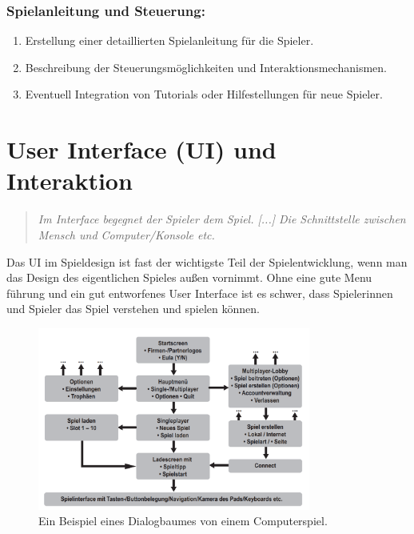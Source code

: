 \subsection{Spielanleitung und Steuerung:}
\begin{enumerate}
  \item Erstellung einer detaillierten Spielanleitung für die Spieler.
  \item Beschreibung der Steuerungsmöglichkeiten und Interaktionsmechanismen.
  \item Eventuell Integration von Tutorials oder Hilfestellungen für neue Spieler.
\end{enumerate}

\chapter{User Interface (UI) und Interaktion}

\begin{quote}
\emph{\glqq Im Interface begegnet der Spieler dem Spiel. [...] Die Schnittstelle zwischen Mensch und Computer/Konsole etc.\grqq}~\cite[p.~161]{GameDesign} \\
\end{quote}

Das UI im Spieldesign ist fast der wichtigste Teil der Spielentwicklung, wenn man das Design des eigentlichen Spieles außen vornimmt. 
Ohne eine gute Menu führung und ein gut entworfenes User Interface ist es schwer, dass Spielerinnen und Spieler das Spiel verstehen und spielen können. 

\begin{figure}[H]
  \centering
  \includegraphics[width=0.8\textwidth]{chapters/03/images/Spielinterface.png}
  \caption{Ein Beispiel eines Dialogbaumes von einem Computerspiel.}
  \label{htl01}
\end{figure}

